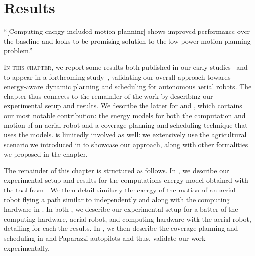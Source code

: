 
%
%
%
%
\chapter{Results}
\label{cp:res}

\begin{chapquote}{\cite{sudhakar2020balancing}}
  ``[Computing energy included motion planning] shows improved performance over the baseline and looks to be promising solution to the low-power motion planning problem.''
\end{chapquote}

\vspace*{1em}

\lettrine{I}{n this chapter}, we report some results both published in our early studies~\citep{seewald2019hlpgpu,seewald2019coarse,seewald2019component,seewald2020mechanical,zamanakos2020energy} and to appear in a forthcoming study~\citep{seewald202Xenergy}, validating our overall approach towards energy-aware dynamic planning and scheduling for autonomous aerial robots. The chapter thus connects to the remainder of the work by describing our experimental setup and results. We describe the latter for  and , which contains our most notable contribution: the energy models for both the computation and motion of an aerial robot and a coverage planning and scheduling technique that uses the models.  is limitedly involved as well: we extensively use the agricultural scenario we introduced in  to showcase our approach, along with other formalities we proposed in the chapter.

The remainder of this chapter is structured as follows. In , we describe our experimental setup and results for the computations energy model obtained with the \powprof{} tool from . We then detail similarly the energy of the motion of an aerial robot flying a path similar to  independently and along with the computing hardware in . In both , we describe our experimental setup for a batter of the computing hardware, aerial robot, and computing hardware with the aerial robot, detailing for each the results. In , we then describe the coverage planning and scheduling in \matlab and Paparazzi autopilots and thus, validate our work experimentally.


